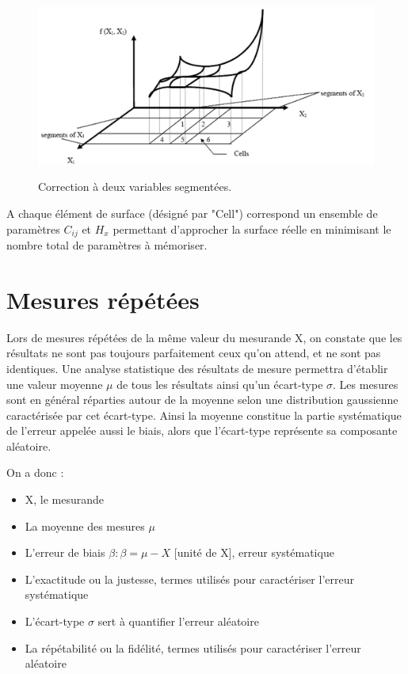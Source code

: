 \begin{figure}
    \centering
    \includegraphics[height=6cm]{assets/figures/3_6_Correction_a_2_variables_segementees.PNG}
    \caption{Correction à deux variables segmentées.}
    \label{fig:Correction_a_2_variables_segementees}
\end{figure}

A chaque élément de surface (désigné par "Cell") correspond un ensemble de paramètres $C_{ij}$ et $H_x$ permettant d'approcher la surface réelle en minimisant le nombre total de paramètres à mémoriser.

\section{Mesures répétées}

Lors de mesures répétées de la même valeur du mesurande X, on constate que les résultats ne sont pas toujours parfaitement ceux qu'on attend, et ne sont pas identiques. Une analyse statistique des résultats de mesure permettra d'établir une valeur moyenne $\mu$ de tous les résultats ainsi qu'un écart-type $\sigma$. Les mesures sont en général réparties autour de la moyenne selon une distribution gaussienne caractérisée par cet écart-type. Ainsi la moyenne constitue la partie systématique de l'erreur appelée aussi le biais, alors que l'écart-type représente sa composante aléatoire.

\newpage
On a donc :
\begin{itemize}
    \item X, le mesurande
    \item La moyenne des mesures $\mu$
    \item L'erreur de biais $\beta :  \beta = \mu - X$  [unité de X], erreur systématique
    \item L'exactitude ou la justesse, termes utilisés pour caractériser l'erreur systématique
    \item L'écart-type $\sigma$ sert à quantifier l'erreur aléatoire
    \item La répétabilité ou la fidélité, termes utilisés pour caractériser l'erreur aléatoire
\end{itemize}

